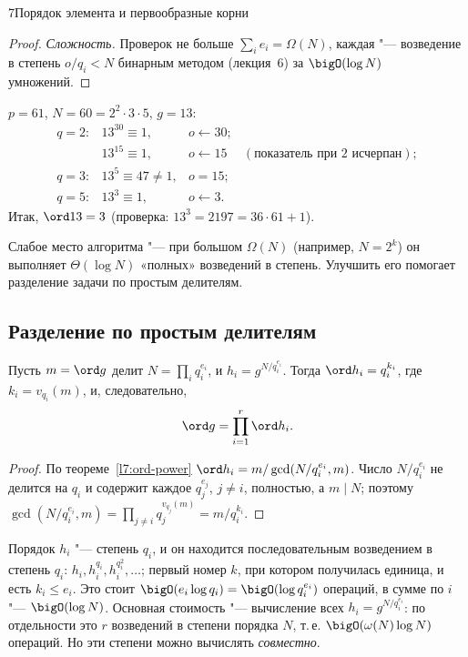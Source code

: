 \begin{lecture}{7}{Порядок элемента и первообразные корни}
\begin{proof}
\emph{Сложность.} Проверок не больше $\sum_i e_i = \Omega(N)$, каждая "--- возведение в степень
$o/q_i < N$ бинарным методом (лекция~6) за $\bigO(\log N)$ умножений.
\end{proof}

\begin{example}\label{l7:ex-reduction}
$p = 61$, $N = 60 = 2^2 \cdot 3 \cdot 5$, $g = 13$:
\[
\begin{array}{llll}
  q = 2: & 13^{30} \equiv 1, & o \gets 30; & \\
         & 13^{15} \equiv 1, & o \gets 15 & (\text{показатель при } 2 \text{ исчерпан});\\
  q = 3: & 13^{5} \equiv 47 \ne 1, & o = 15; & \\
  q = 5: & 13^{3} \equiv 1, & o \gets 3. &
\end{array}
\]
Итак, $\ord 13 = 3$ (проверка: $13^3 = 2197 = 36 \cdot 61 + 1$).
\end{example}


Слабое место алгоритма "--- при большом $\Omega(N)$ (например, $N = 2^k$) он выполняет
$\Theta(\log N)$ «полных» возведений в степень. Улучшить его помогает разделение задачи по
простым делителям.

\subsection{Разделение по простым делителям}

\begin{lemma}\label{l7:prime-parts}
Пусть $m = \ord g$ делит $N = \prod_i q_i^{e_i}$, и $h_i = g^{N/q_i^{e_i}}$. Тогда
$\ord h_i = q_i^{k_i}$, где $k_i = v_{q_i}(m)$, и, следовательно,
\[
  \ord g = \prod_{i=1}^r \ord h_i.
\]
\end{lemma}

\begin{proof}
По теореме~\ref{l7:ord-power} $\ord h_i = m / \gcd(N/q_i^{e_i}, m)$. Число $N/q_i^{e_i}$ не
делится на $q_i$ и содержит каждое $q_j^{e_j}$, $j \ne i$, полностью, а $m \mid N$; поэтому
$\gcd(N/q_i^{e_i}, m) = \prod_{j \ne i} q_j^{v_{q_j}(m)} = m / q_i^{k_i}$.
\end{proof}

Порядок $h_i$ "--- степень $q_i$, и он находится последовательным возведением в степень $q_i$:
$h_i, h_i^{q_i}, h_i^{q_i^2}, \dots$; первый номер $k$, при котором получилась единица, и есть
$k_i \le e_i$. Это стоит $\bigO(e_i \log q_i) = \bigO(\log q_i^{e_i})$ операций, в сумме по $i$
"--- $\bigO(\log N)$. Основная стоимость "--- вычисление всех $h_i = g^{N/q_i^{e_i}}$:
по отдельности это $r$ возведений в степени порядка $N$, т.\,е. $\bigO(\omega(N) \log N)$
операций. Но эти степени можно вычислять \emph{совместно}.


\end{lecture}
